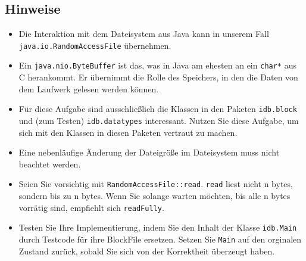 \subsection{Hinweise}
\begin{itemize}
	\item Die Interaktion mit dem Dateisystem aus Java kann in unserem Fall \normaltxt{\linebreak}\texttt{java.io.RandomAccessFile} übernehmen.
	\item Ein \texttt{java.nio.ByteBuffer} ist das, was in Java am ehesten an ein \texttt{char*} aus C herankommt.
		Er übernimmt die Rolle des Speichers, in den die Daten von dem Laufwerk gelesen werden können.
	\item Für diese Aufgabe sind ausschließlich die Klassen in den Paketen \texttt{idb.block} und (zum Testen) \texttt{idb.datatypes} interessant.
		Nutzen Sie diese Aufgabe, um sich mit den Klassen in diesen Paketen vertraut zu machen.
	\item Eine nebenläufige Änderung der Dateigröße im Dateisystem muss nicht beachtet werden.
	\item Seien Sie vorsichtig mit \texttt{RandomAccessFile::read}. \texttt{read} liest nicht n bytes, sondern bis zu n bytes.
		Wenn Sie solange warten möchten, bis alle n bytes vorrätig sind, empfiehlt sich \texttt{readFully}.
	\item Testen Sie Ihre Implementierung, indem Sie den Inhalt der Klasse \texttt{idb.Main} durch Testcode für ihre BlockFile ersetzen.
		Setzen Sie \texttt{Main} auf den orginalen Zustand zurück, sobald Sie sich von der Korrektheit überzeugt haben.
\end{itemize}
